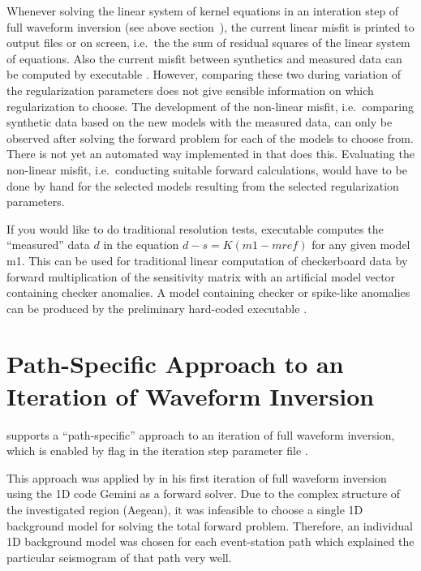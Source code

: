 Whenever solving the linear system of kernel equations in an interation step of full waveform inversion
(see above section~), the current linear misfit is
printed to output files or on screen, i.e.\ the
the sum of residual squares of the linear system of equations. Also the current misfit between synthetics 
and measured data can be computed by executable 
.
However, comparing these two during variation of the regularization parameters does not give sensible
information on which regularization to choose. The development of the non-linear misfit, i.e.\ comparing
synthetic data based on the new models with the measured data, can only be observed after solving the
forward problem for each of the models to choose from. There is not yet an automated way implemented in
\ASKI{} that does this. Evaluating the non-linear misfit, i.e.\ conducting suitable forward calculations, 
would have to be done by hand for the selected models resulting from the selected regularization parameters.

If you would like to do traditional resolution tests, 
executable  
computes the ``measured'' data $d$ in the equation $d-s = K (m1 - mref)$ for any given model m1.
This can be used for traditional linear computation of checkerboard data by forward multiplication 
of the sensitivity matrix with an artificial model vector containing checker anomalies.
A model containing checker or spike-like anomalies can be produced by the preliminary hard-coded executable
 .
%
\section{Path-Specific Approach to an Iteration of Waveform Inversion} \label{basic_steps,sec:path_specific}
%
\ASKI{} supports a ``path-specific'' approach to an iteration of full waveform inversion, which is enabled
by flag  in the iteration step parameter file .

This approach was applied by \cite{Lamara.2015b} in his first iteration of full waveform inversion
using the 1D code Gemini as a forward solver. Due to the complex structure of the investigated region
(Aegean), it was infeasible to choose a single 1D background model for solving the total forward problem. 
Therefore, an individual 1D background model was chosen for each event-station path which explained
the particular seismogram of that path very well. 

